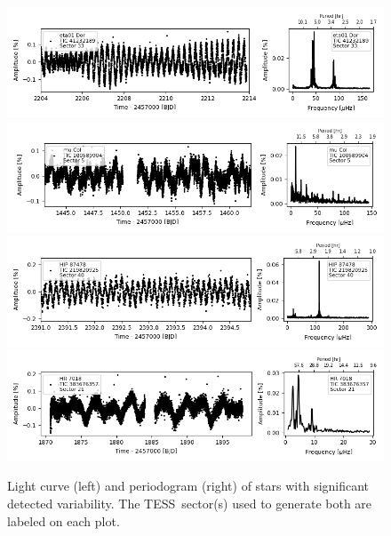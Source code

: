 \documentclass[twocolumn]{aastex631}
\newcommand{\tess}{TESS}
\begin{document}
\begin{figure}
    \centering

    \includegraphics[width=0.9\linewidth]{figures/tic00000041232189_s033_norm1.fits}
    \includegraphics[width=0.9\linewidth]{figures/tic00000100589904_s005_norm1.fits}
    \includegraphics[width=0.9\linewidth]{figures/tic00000219820925_s040_norm1.fits.png}
    \includegraphics[width=0.9\linewidth]{figures/tic00000383676357_s021_norm1.fits.png}

    \caption{Light curve (left) and periodogram (right) of stars with significant detected variability. The \tess\ sector(s) used to generate both are labeled on each plot.}
    \label{fig:lcft3}
\end{figure}
    
\end{document}
